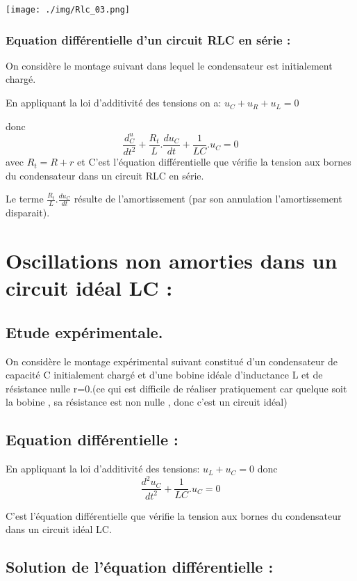 \documentclass[12pt]{article}
\begin{document}
\begin{center}
	\texttt{[image: ./img/Rlc\_03.png]}
\end{center}

\subsubsection{Equation différentielle d'un circuit RLC en série : }


On considère le montage suivant dans lequel le condensateur est initialement chargé.

En appliquant la loi d'additivité des tensions on a: $u_C + u_R + u_L = 0$ 

donc $$\frac{d^u_C}{dt^2} + \frac{R_t}{L}.\frac{du_C}{dt} + \frac{1}{LC}.u_C = 0$$ avec $R_t=R + r$ et C'est l'équation différentielle que vérifie la tension aux bornes du condensateur dans un circuit RLC en série. 

Le terme $\frac{R_t}{L}.\frac{du_C}{dt}$ résulte de l'amortissement (par son annulation l'amortissement disparait).


\section{Oscillations non amorties dans un circuit idéal LC :}
\subsection{Etude expérimentale.}

On considère le montage expérimental suivant constitué d'un condensateur de capacité C initialement chargé et d'une bobine
idéale d'inductance L et de résistance nulle r=0.(ce qui est difficile de réaliser pratiquement car quelque soit la bobine , sa
résistance est non nulle , donc c'est un circuit idéal)


\subsection{Equation différentielle : }

En appliquant la loi d'additivité des tensions: $u_L + u_C = 0$ donc  $$\frac{d^2u_C}{dt^2} + \frac{1}{LC}.u_C = 0$$

C'est l'équation différentielle que vérifie la tension aux bornes du condensateur dans un circuit idéal LC.

\subsection{Solution de l'équation  différentielle : }
\end{document}
